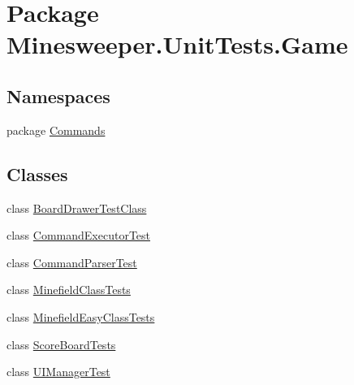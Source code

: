 \hypertarget{namespace_minesweeper_1_1_unit_tests_1_1_game}{\section{Package Minesweeper.\+Unit\+Tests.\+Game}
\label{namespace_minesweeper_1_1_unit_tests_1_1_game}
}
\subsection*{Namespaces}
\begin{DoxyCompactItemize}
\item 
package \hyperlink{namespace_minesweeper_1_1_unit_tests_1_1_game_1_1_commands}{Commands}
\end{DoxyCompactItemize}
\subsection*{Classes}
\begin{DoxyCompactItemize}
\item 
class \hyperlink{class_minesweeper_1_1_unit_tests_1_1_game_1_1_board_drawer_test_class}{Board\+Drawer\+Test\+Class}
\item 
class \hyperlink{class_minesweeper_1_1_unit_tests_1_1_game_1_1_command_executor_test}{Command\+Executor\+Test}
\item 
class \hyperlink{class_minesweeper_1_1_unit_tests_1_1_game_1_1_command_parser_test}{Command\+Parser\+Test}
\item 
class \hyperlink{class_minesweeper_1_1_unit_tests_1_1_game_1_1_minefield_class_tests}{Minefield\+Class\+Tests}
\item 
class \hyperlink{class_minesweeper_1_1_unit_tests_1_1_game_1_1_minefield_easy_class_tests}{Minefield\+Easy\+Class\+Tests}
\item 
class \hyperlink{class_minesweeper_1_1_unit_tests_1_1_game_1_1_score_board_tests}{Score\+Board\+Tests}
\item 
class \hyperlink{class_minesweeper_1_1_unit_tests_1_1_game_1_1_u_i_manager_test}{U\+I\+Manager\+Test}
\end{DoxyCompactItemize}

